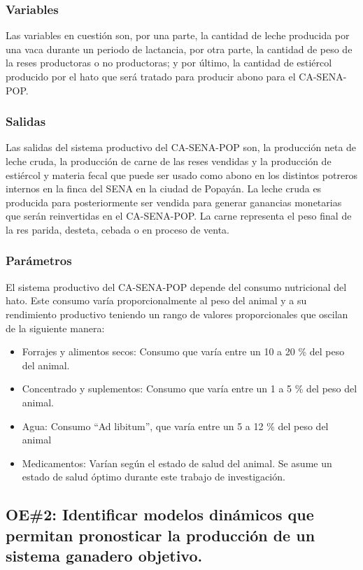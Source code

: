 \subsubsection{Variables}
Las variables en cuestión son, por una parte, la cantidad de leche producida por una vaca durante un periodo de lactancia, por otra parte, la cantidad de peso de la reses productoras o no productoras; y por último, la cantidad de estiércol producido por el hato que será tratado para producir abono para el CA-SENA-POP.

\subsubsection{Salidas}

Las salidas del sistema productivo del CA-SENA-POP son, la producción neta de leche cruda, la producción de carne de las reses vendidas y la producción de estiércol y materia fecal que puede ser usado como abono en los distintos potreros internos en la finca del SENA en la ciudad de Popayán. La leche cruda es producida para posteriormente ser vendida para generar ganancias monetarias que serán reinvertidas en el CA-SENA-POP. La carne representa el peso final de la res parida, desteta, cebada o en proceso de venta. 

\subsubsection{Parámetros}

El sistema productivo del CA-SENA-POP depende del consumo nutricional del hato. Este consumo varía proporcionalmente al peso del animal y a su rendimiento productivo teniendo un rango de valores proporcionales que oscilan de la siguiente manera:
\begin{itemize}
    \item Forrajes y alimentos secos: Consumo que varía entre un 10 a 20 \% del peso del animal.
    \item Concentrado y suplementos: Consumo que varía entre un 1 a 5 \% del peso del animal.
    \item Agua: Consumo ``Ad libitum'', que varía entre un 5 a 12 \% del peso del animal
    \item Medicamentos: Varían según el estado de salud del animal. Se asume un estado de salud óptimo durante este trabajo de investigación.
\end{itemize}

\subsection{OE\#2: Identificar modelos dinámicos que permitan pronosticar la producción de un sistema ganadero objetivo.}

